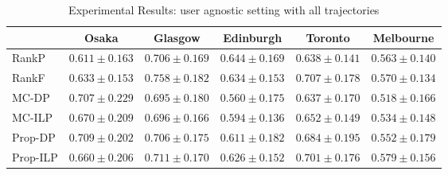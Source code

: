 
\begin{table*}
    \centering
    \caption{Experimental Results: user agnostic setting with all trajectories}
    \begin{tabular}{l|ccccc} \hline
         & Osaka & Glasgow & Edinburgh & Toronto & Melbourne \\ \hline
        RankP & $0.611\pm0.163$ & $0.706\pm0.169$ & $\mathbf{0.644\pm0.169}$ & $0.638\pm0.141$ & $0.563\pm0.140$ \\
        RankF & $0.633\pm0.153$ & $\mathbf{0.758\pm0.182}$ & $0.634\pm0.153$ & $\mathbf{0.707\pm0.178}$ & $0.570\pm0.134$ \\
        MC-DP & $0.707\pm0.229$ & $0.695\pm0.180$ & $0.560\pm0.175$ & $0.637\pm0.170$ & $0.518\pm0.166$ \\
        MC-ILP & $0.670\pm0.209$ & $0.696\pm0.166$ & $0.594\pm0.136$ & $0.652\pm0.149$ & $0.534\pm0.148$ \\
        Prop-DP & $\mathbf{0.709\pm0.202}$ & $0.706\pm0.175$ & $0.611\pm0.182$ & $0.684\pm0.195$ & $0.552\pm0.179$ \\
        Prop-ILP & $0.660\pm0.206$ & $0.711\pm0.170$ & $0.626\pm0.152$ & $0.701\pm0.176$ & $\mathbf{0.579\pm0.156}$ \\
        \hline
    \end{tabular}
\end{table*}


